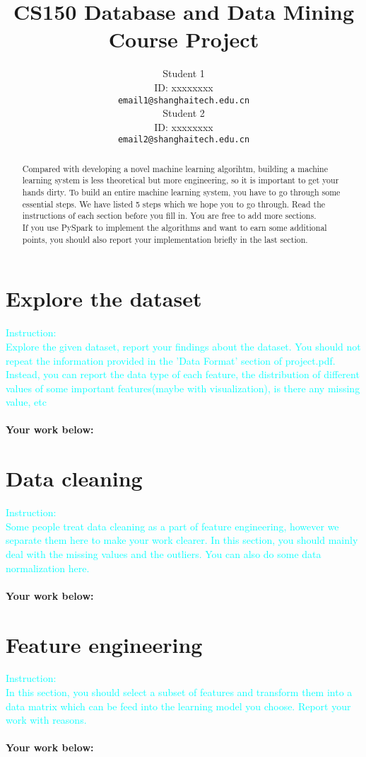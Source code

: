 \documentclass{article}
\title{CS150 Database and Data Mining\\Course Project}
\author{
  Student 1\\
  ID: xxxxxxxx\\
  \texttt{email1@shanghaitech.edu.cn} \\
   \And
  Student 2\\
  ID: xxxxxxxx\\
  \texttt{email2@shanghaitech.edu.cn}
}
\begin{document}

\maketitle

\begin{abstract}

Compared with developing a novel machine learning algorihtm, building a machine learning system is less theoretical but more engineering, so it is important to get your hands dirty. To build an entire machine learning system, you have to go through some essential steps. We have listed 5 steps which we hope you to go through. Read the instructions of each section before you fill in. You are free to add more sections. \\
If you use PySpark to implement the algorithms and want to earn some additional points, you should also report your implementation briefly in the last section.
\end{abstract}

\section{Explore the dataset}
\textcolor{cyan}{Instruction: \\
Explore the given dataset, report your findings about the dataset. You should not repeat the information provided in the 'Data Format' section of project.pdf. Instead, you can report the data type of each feature, the distribution of different values of some important features(maybe with visualization), is there any missing value, etc}\\\\
\textbf{Your work below:}\\
\section{Data cleaning}
\textcolor{cyan}{Instruction: \\
Some people treat data cleaning as a part of feature engineering, however we separate them here to make your work clearer. In this section, you should mainly deal with the missing values and the outliers. You can also do some data normalization here.}\\\\
\textbf{Your work below:}\\
\section{Feature engineering}
\textcolor{cyan}{Instruction: \\
In this section, you should select a subset of features and transform them into a data matrix which can be feed into the learning model you choose. Report your work with reasons.}\\\\
\textbf{Your work below:}\\
\end{document}
